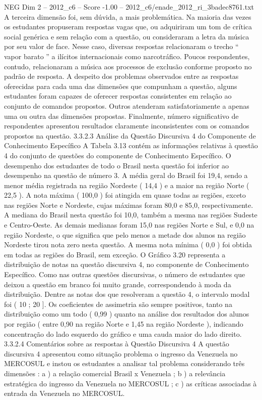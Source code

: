\begin{textsample}{NEG Dim 2 – 2012\_c6 – Score -1.00 – 2012\_c6/enade\_2012\_ri\_3badec8761.txt}
A terceira dimensão foi, sem dúvida, a mais problemática.
Na maioria das vezes os estudantes propuseram respostas vagas que, ou adquiriram um tom de crítica social genérica e sem relação com a questão, ou consideraram a letra da música por seu valor de face.
Nesse caso, diversas respostas relacionaram o trecho “ vapor barato ” a ilícitos internacionais como narcotráfico.
Poucos respondentes, contudo, relacionaram a música aos processos de exclusão conforme proposto no padrão de resposta.
A despeito dos problemas observados entre as respostas oferecidas para cada uma das dimensões que compunham a questão, alguns estudantes foram capazes de oferecer respostas consistentes em relação ao conjunto de comandos propostos.
Outros atenderam satisfatoriamente a apenas uma ou outra das dimensões propostas.
Finalmente, número significativo de respondentes apresentou resultados claramente inconsistentes com os comandos propostos na questão. 3.3.2.3 Análise da Questão Discursiva 4 do Componente de Conhecimento Específico A Tabela 3.13 contém as informações relativas à questão 4 do conjunto de questões do componente de Conhecimento Específico.
O desempenho dos estudantes de todo o Brasil nesta questão foi inferior ao desempenho na questão de número 3.
A média geral do Brasil foi 19,4, sendo a menor média registrada na região Nordeste ( 14,4 ) e a maior na região Norte ( 22,5 ).
A nota máxima ( 100,0 ) foi atingida em quase todas as regiões, exceto nas regiões Norte e Nordeste, cujas máximas foram 80,0 e 85,0, respectivamente.
A mediana do Brasil nesta questão foi 10,0, também a mesma nas regiões Sudeste e Centro-Oeste.
As demais medianas foram 15,0 nas regiões Norte e Sul, e 0,0 na região Nordeste, o que significa que pelo menos a metade dos alunos na região Nordeste tirou nota zero nesta questão.
A mesma nota mínima ( 0,0 ) foi obtida em todas as regiões do Brasil, sem exceção.
O Gráfico 3.20 representa a distribuição de notas na questão discursiva 4, no componente de Conhecimento Específico.
Como nas outras questões discursivas, o número de estudantes que deixou a questão em branco foi muito grande, correspondendo à moda da distribuição.
Dentre as notas dos que resolveram a questão 4, o intervalo modal foi ( 10 ; 20 ].
Os coeficientes de assimetria são sempre positivos, tanto na distribuição como um todo ( 0,99 ) quanto na análise dos resultados dos alunos por região ( entre 0,90 na região Norte e 1,45 na região Nordeste ), indicando concentração do lado esquerdo do gráfico e uma cauda maior do lado direito. 3.3.2.4 Comentários sobre as respostas à Questão Discursiva 4 A questão discursiva 4 apresentou como situação problema o ingresso da Venezuela no MERCOSUL e instou os estudantes a analisar tal problema considerando três dimensões : a ) a relação comercial Brasil x Venezuela ; b ) a relevância estratégica do ingresso da Venezuela no MERCOSUL ; c ) as críticas associadas à entrada da Venezuela no MERCOSUL.

\end{textsample}
